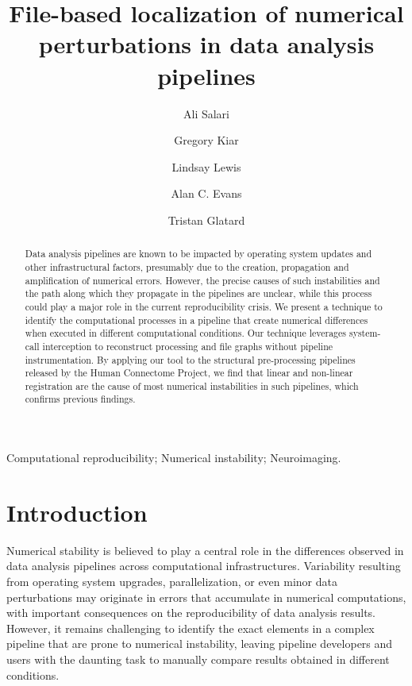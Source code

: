 \documentclass[a4paper,num-refs]{oup-contemporary}
\title{File-based localization of numerical perturbations in data analysis pipelines}
\begin{document}
\author[1]{Ali Salari}
\author[2,3]{Gregory Kiar}
\author[2]{Lindsay Lewis}
\author[2,3]{Alan C. Evans}
\author[1]{Tristan Glatard}




\maketitle

\begin{abstract} 

Data analysis pipelines are known to be impacted by operating system
updates and other infrastructural factors, presumably due to the creation,
propagation and amplification of numerical errors. However, the precise
causes of such instabilities and the path along which they propagate in the
pipelines are unclear, while this process could play a major role in the
current reproducibility crisis. We present a technique to identify the
computational processes in a pipeline that create numerical differences
when executed in different computational conditions. Our technique
leverages system-call interception to reconstruct processing and file
graphs without pipeline instrumentation. By applying our tool to the
structural pre-processing pipelines released by the Human Connectome
Project, we find that linear and non-linear registration are the cause of
most numerical instabilities in such pipelines, which confirms previous
findings. 

\end{abstract}

\begin{keywords}
Computational reproducibility; Numerical instability; Neuroimaging.
\end{keywords}


\section{Introduction}


Numerical stability is believed to play a central role in the differences
observed in data analysis pipelines across computational infrastructures.
Variability resulting from operating system upgrades, parallelization, or
even minor data perturbations may originate in errors that accumulate in
numerical computations, with important consequences on the reproducibility
of data analysis results. However, it remains challenging to identify the
exact elements in a complex pipeline that are prone to numerical instability,
leaving pipeline developers and users with the daunting task to manually
compare results obtained in different conditions. 
\end{document}
